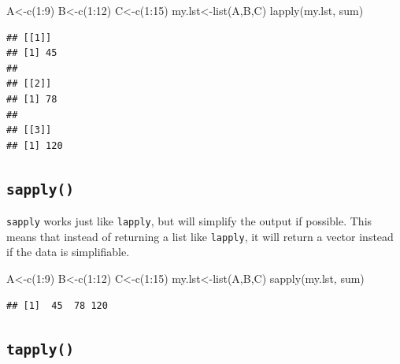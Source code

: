 \documentclass[
]{book}
\newenvironment{Shaded}{\begin{snugshade}}{\end{snugshade}}
\newcommand{\DecValTok}[1]{\textcolor[rgb]{0.00,0.00,0.81}{#1}}
\newcommand{\FunctionTok}[1]{\textcolor[rgb]{0.00,0.00,0.00}{#1}}
\newcommand{\NormalTok}[1]{#1}
\newcommand{\OtherTok}[1]{\textcolor[rgb]{0.56,0.35,0.01}{#1}}
\newcommand{\SpecialCharTok}[1]{\textcolor[rgb]{0.00,0.00,0.00}{#1}}
\theoremstyle{definition}
\theoremstyle{definition}
\theoremstyle{definition}
\theoremstyle{definition}
\theoremstyle{remark}
\begin{document}
\begin{Shaded}
\begin{Highlighting}[]
\NormalTok{A}\OtherTok{\textless{}{-}}\FunctionTok{c}\NormalTok{(}\DecValTok{1}\SpecialCharTok{:}\DecValTok{9}\NormalTok{)}
\NormalTok{B}\OtherTok{\textless{}{-}}\FunctionTok{c}\NormalTok{(}\DecValTok{1}\SpecialCharTok{:}\DecValTok{12}\NormalTok{)}
\NormalTok{C}\OtherTok{\textless{}{-}}\FunctionTok{c}\NormalTok{(}\DecValTok{1}\SpecialCharTok{:}\DecValTok{15}\NormalTok{)}
\NormalTok{my.lst}\OtherTok{\textless{}{-}}\FunctionTok{list}\NormalTok{(A,B,C)}
\FunctionTok{lapply}\NormalTok{(my.lst, sum)}
\end{Highlighting}
\end{Shaded}

\begin{verbatim}
## [[1]]
## [1] 45
## 
## [[2]]
## [1] 78
## 
## [[3]]
## [1] 120
\end{verbatim}

\hypertarget{sapply}{%
\subsection{\texorpdfstring{\texttt{sapply()}}{sapply()}}\label{sapply}}

\texttt{sapply} works just like \texttt{lapply}, but will simplify the output if possible. This means that instead of returning a list like \texttt{lapply}, it will return a vector instead if the data is simplifiable.

\begin{Shaded}
\begin{Highlighting}[]
\NormalTok{A}\OtherTok{\textless{}{-}}\FunctionTok{c}\NormalTok{(}\DecValTok{1}\SpecialCharTok{:}\DecValTok{9}\NormalTok{)}
\NormalTok{B}\OtherTok{\textless{}{-}}\FunctionTok{c}\NormalTok{(}\DecValTok{1}\SpecialCharTok{:}\DecValTok{12}\NormalTok{)}
\NormalTok{C}\OtherTok{\textless{}{-}}\FunctionTok{c}\NormalTok{(}\DecValTok{1}\SpecialCharTok{:}\DecValTok{15}\NormalTok{)}
\NormalTok{my.lst}\OtherTok{\textless{}{-}}\FunctionTok{list}\NormalTok{(A,B,C)}
\FunctionTok{sapply}\NormalTok{(my.lst, sum)}
\end{Highlighting}
\end{Shaded}

\begin{verbatim}
## [1]  45  78 120
\end{verbatim}

\hypertarget{tapply}{%
\subsection{\texorpdfstring{\texttt{tapply()}}{tapply()}}\label{tapply}}
\end{document}
